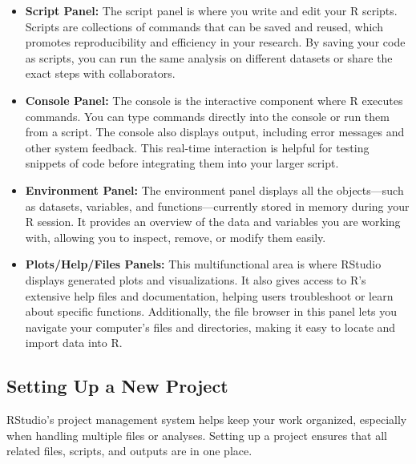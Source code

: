 \documentclass[
]{book}
\begin{document}
\begin{itemize}
\item
  \textbf{Script Panel:} The script panel is where you write and edit your R scripts. Scripts are collections of commands that can be saved and reused, which promotes reproducibility and efficiency in your research. By saving your code as scripts, you can run the same analysis on different datasets or share the exact steps with collaborators.
\item
  \textbf{Console Panel:} The console is the interactive component where R executes commands. You can type commands directly into the console or run them from a script. The console also displays output, including error messages and other system feedback. This real-time interaction is helpful for testing snippets of code before integrating them into your larger script.
\item
  \textbf{Environment Panel:} The environment panel displays all the objects---such as datasets, variables, and functions---currently stored in memory during your R session. It provides an overview of the data and variables you are working with, allowing you to inspect, remove, or modify them easily.
\item
  \textbf{Plots/Help/Files Panels:} This multifunctional area is where RStudio displays generated plots and visualizations. It also gives access to R's extensive help files and documentation, helping users troubleshoot or learn about specific functions. Additionally, the file browser in this panel lets you navigate your computer's files and directories, making it easy to locate and import data into R.
\end{itemize}

\subsection*{Setting Up a New Project}\label{setting-up-a-new-project}

RStudio's project management system helps keep your work organized, especially when handling multiple files or analyses. Setting up a project ensures that all related files, scripts, and outputs are in one place.
\end{document}
